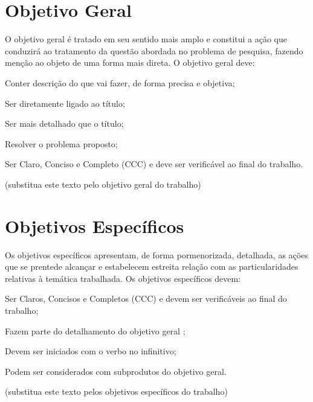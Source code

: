 \section{Objetivo Geral}
\label{sec:objgeral}
O objetivo geral é tratado em seu sentido mais amplo e constitui a ação que conduzirá ao tratamento da questão abordada no problema de pesquisa, fazendo menção ao objeto de uma forma mais direta. O objetivo geral deve:

Conter descrição do que vai fazer, de forma precisa e objetiva;

Ser diretamente ligado ao título;

Ser mais detalhado que o título;

Resolver o problema proposto;

Ser Claro, Conciso e Completo (CCC) e deve ser verificável ao final do trabalho.

(substitua este texto pelo objetivo geral do trabalho)

\section{Objetivos Específicos}
\label{sec:objespc}
Os objetivos específicos apresentam, de forma pormenorizada, detalhada, as ações que se prentede alcançar e estabelecem estreita relação com as particularidades relativas à temática trabalhada. Os objetivos específicos devem:

Ser Claros, Concisos e Completos (CCC) e devem ser verificáveis ao final do trabalho;

Fazem parte do detalhamento do objetivo geral ;

Devem ser iniciados com o verbo no infinitivo;

Podem ser considerados com subprodutos do objetivo geral.

(substitua este texto pelos objetivos específicos do trabalho)

  


